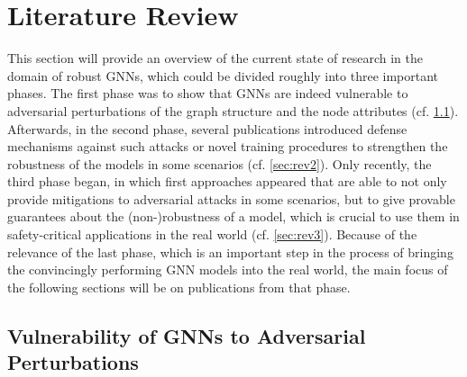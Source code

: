 \documentclass[a4paper,preprint]{sig-alternate}
\begin{document}
\section{Literature Review}
\label{sec:literature}

This section will provide an overview of the current state of research in the domain of robust GNNs, which could be divided
roughly into three important phases.
The first phase was to show that GNNs are indeed vulnerable to adversarial perturbations of the graph structure and the node attributes (cf. \ref{sec:rev1}).
Afterwards, in the second phase, several publications introduced defense mechanisms against such attacks or novel training procedures 
to strengthen the robustness of the models in some scenarios (cf. \ref{sec:rev2}). Only recently, the third phase began, in which first approaches appeared
that are able to not only provide mitigations to adversarial attacks in some scenarios, but to give provable guarantees about the (non-)robustness 
of a model, which is crucial to use them in safety-critical applications in the real world (cf. \ref{sec:rev3}). Because of the relevance of the last phase, 
which is an important step in the process of bringing the convincingly performing GNN models into the real world, the main focus of the following sections
will be on publications from that phase.

\subsection{Vulnerability of GNNs to Adversarial Perturbations}
\label{sec:rev1}
\end{document}
